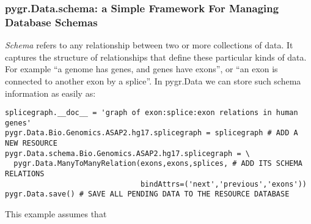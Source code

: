 \documentclass{howto}
\begin{document}
\subsubsection{pygr.Data.schema: a Simple Framework For Managing Database Schemas}
{\em Schema} refers to any relationship between two or more collections of
data.  It captures the structure of relationships that define these particular
kinds of data.  For example ``a genome has genes, and genes have exons'', or 
``an exon is connected to another exon by a splice''.  In pygr.Data we can
store such schema information as easily as:
\begin{verbatim}
splicegraph.__doc__ = 'graph of exon:splice:exon relations in human genes'
pygr.Data.Bio.Genomics.ASAP2.hg17.splicegraph = splicegraph # ADD A NEW RESOURCE
pygr.Data.schema.Bio.Genomics.ASAP2.hg17.splicegraph = \
  pygr.Data.ManyToManyRelation(exons,exons,splices, # ADD ITS SCHEMA RELATIONS
                               bindAttrs=('next','previous','exons'))
pygr.Data.save() # SAVE ALL PENDING DATA TO THE RESOURCE DATABASE
\end{verbatim}
This example assumes that 
\end{document}
